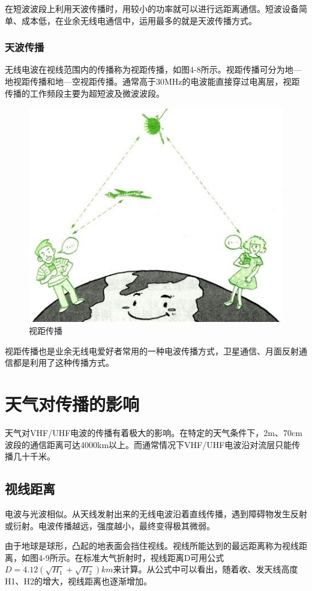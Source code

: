 \documentclass[12pt,UTF8]{ctexbook}
\begin{document}
在短波波段上利用天波传播时，用较小的功率就可以进行远距离通信。短波设备简单、成本低，在业余无线电通信中，运用最多的就是天波传播方式。

\subsubsection{天波传播}

无线电波在视线范围内的传播称为视距传播，如图4-8所示。视距传播可分为地—地视距传播和地—空视距传播。通常高于30MHz的电波能直接穿过电离层，视距传播的工作频段主要为超短波及微波波段。

\begin{figure}[htbp]
	\centering
	\includegraphics[width=0.7\linewidth]{51}
	\caption{视距传播}
	\label{fig:1}
\end{figure}

视距传播也是业余无线电爱好者常用的一种电波传播方式，卫星通信、月面反射通信都是利用了这种传播方式。

\section{天气对传播的影响}

天气对VHF/UHF电波的传播有着极大的影响。在特定的天气条件下，2m、70cm波段的通信距离可达4000km以上。而通常情况下VHF/UHF电波沿对流层只能传播几十千米。

\subsection{视线距离}

电波与光波相似。从天线发射出来的无线电波沿着直线传播，遇到障碍物发生反射或衍射。电波传播越远，强度越小，最终变得极其微弱。

由于地球是球形，凸起的地表面会挡住视线。视线所能达到的最远距离称为视线距离，如图4-9所示。在标准大气折射时，视线距离D可用公式$ D = 4.12\left ( \sqrt{H_{1} } +  \sqrt{H_{2} } \right ) km $来计算。从公式中可以看出，随着收、发天线高度H1、H2的增大，视线距离也逐渐增加。
\end{document}
